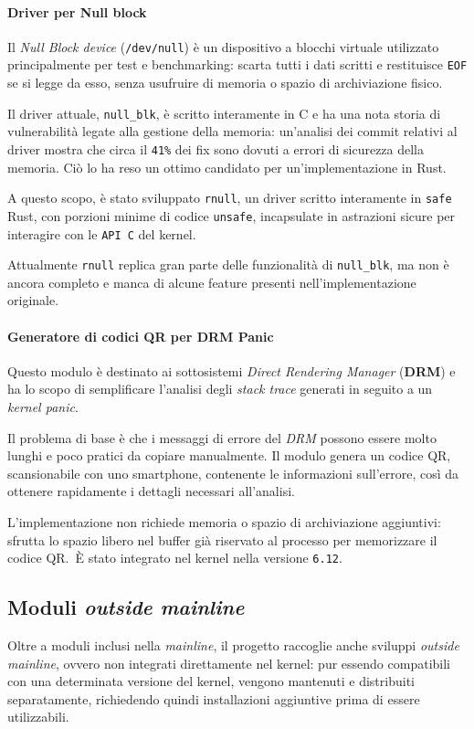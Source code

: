 \paragraph{Driver per Null block}
Il \textit{Null Block device} (\texttt{/dev/null}) è un dispositivo a blocchi virtuale utilizzato principalmente per test e benchmarking: scarta tutti i dati scritti e restituisce \texttt{EOF} se si legge da esso, senza usufruire di memoria o spazio di archiviazione fisico.

Il driver attuale, \texttt{null\_blk}, è scritto interamente in C e ha una nota storia di vulnerabilità legate alla gestione della memoria: un'analisi dei 
commit relativi al driver mostra che circa il \texttt{41\%} dei fix sono dovuti a errori di sicurezza della memoria\cite{null-blk}.
Ciò lo ha reso un ottimo candidato per un'implementazione in Rust.

A questo scopo, è stato sviluppato \texttt{rnull}, un driver scritto interamente in \texttt{safe} Rust, con porzioni minime di codice \texttt{unsafe}, incapsulate in astrazioni sicure
 per interagire con le \texttt{API C} del kernel.

 Attualmente \texttt{rnull} replica gran parte delle funzionalità di \texttt{null\_blk}, ma non è ancora completo e manca di alcune feature presenti nell'implementazione originale.

\paragraph{Generatore di codici QR per DRM Panic}
Questo modulo è destinato ai sottosistemi \textit{Direct Rendering Manager} (\textbf{DRM}) e ha lo scopo di semplificare l'analisi degli 
\textit{stack trace} generati in seguito a un \textit{kernel panic}.

Il problema di base è che i messaggi di errore del \textit{DRM} possono essere molto lunghi e poco pratici da copiare manualmente.
Il modulo genera un codice QR, scansionabile con uno smartphone, contenente le informazioni sull'errore, così da ottenere 
rapidamente i dettagli necessari all'analisi.

L'implementazione non richiede memoria o spazio di archiviazione aggiuntivi: sfrutta lo spazio 
libero nel buffer già riservato al processo per memorizzare il codice QR.\ 
È stato integrato nel kernel nella versione \texttt{6.12}.

\subsection{Moduli \textit{outside mainline}}
Oltre a moduli inclusi nella \textit{mainline}, il progetto raccoglie anche sviluppi \textit{outside mainline}, ovvero non integrati direttamente nel kernel: 
pur essendo compatibili con una determinata versione del kernel, vengono mantenuti e distribuiti separatamente, richiedendo quindi installazioni
 aggiuntive prima di essere utilizzabili.

